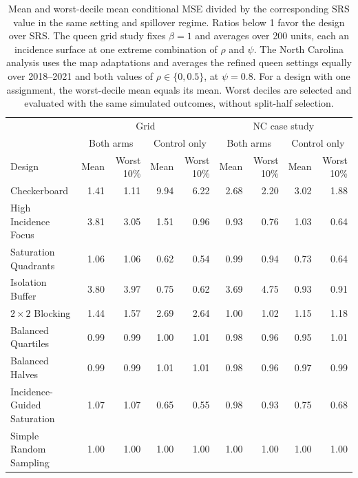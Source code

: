 \documentclass[11pt]{article}
\begin{document}
\begin{table}[!htb]

\footnotesize
\centering
\setlength{\tabcolsep}{4pt}

\caption{Mean and worst-decile mean conditional MSE divided by the corresponding SRS value in the same setting and spillover regime. Ratios below 1 favor the design over SRS. The queen grid study fixes $\beta=1$ and averages over 200 units, each an incidence surface at one extreme combination of $\rho$ and $\psi$. The North Carolina analysis uses the map adaptations and averages the refined queen settings equally over 2018--2021 and both values of $\rho\in\{0,0.5\}$, at $\psi=0.8$. For a design with one assignment, the worst-decile mean equals its mean. Worst deciles are selected and evaluated with the same simulated outcomes, without split-half selection.}
\label{tab:downside}

\begin{tabular}{lrrrrrrrr}

\toprule
& \multicolumn{4}{c}{Grid} & \multicolumn{4}{c}{NC case study} \\
& \multicolumn{2}{c}{Both arms} & \multicolumn{2}{c}{Control only} & \multicolumn{2}{c}{Both arms} & \multicolumn{2}{c}{Control only} \\
Design & Mean & Worst 10\% & Mean & Worst 10\% & Mean & Worst 10\% & Mean & Worst 10\% \\

\midrule
Checkerboard & 1.41 & 1.11 & 9.94 & 6.22 & 2.68 & 2.20 & 3.02 & 1.88 \\
High Incidence Focus & 3.81 & 3.05 & 1.51 & 0.96 & 0.93 & 0.76 & 1.03 & 0.64 \\
Saturation Quadrants & 1.06 & 1.06 & 0.62 & 0.54 & 0.99 & 0.94 & 0.73 & 0.64 \\
Isolation Buffer & 3.80 & 3.97 & 0.75 & 0.62 & 3.69 & 4.75 & 0.93 & 0.91 \\
$2\times2$ Blocking & 1.44 & 1.57 & 2.69 & 2.64 & 1.00 & 1.02 & 1.15 & 1.18 \\
Balanced Quartiles & 0.99 & 0.99 & 1.00 & 1.01 & 0.98 & 0.96 & 0.95 & 1.01 \\
Balanced Halves & 0.99 & 0.99 & 1.01 & 1.01 & 0.98 & 0.96 & 0.97 & 0.99 \\
Incidence-Guided Saturation & 1.07 & 1.07 & 0.65 & 0.55 & 0.98 & 0.93 & 0.75 & 0.68 \\
Simple Random Sampling & 1.00 & 1.00 & 1.00 & 1.00 & 1.00 & 1.00 & 1.00 & 1.00 \\

\bottomrule

\end{tabular}

\end{table}
\end{document}
